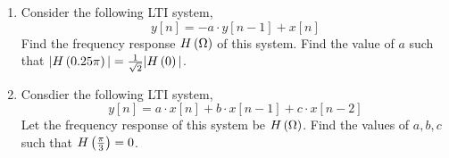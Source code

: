 \documentclass[9pt]{article}
\def\lp{\ensuremath\left(}
\def\rp{\ensuremath\right)}
\begin{document}
\begin{multicols}{2}
\begin{enumerate}
        \item Consider the following LTI system,
        \[ y[n] = -a \cdot y[n-1] + x[n] \]
        Find the frequency response $H\lp \Omega \rp$ of this system. Find the value of $a$ such that $\vert H\lp 0.25\pi \rp\vert = \frac{1}{\sqrt {2}} \lvert H \lp 0 \rp \vert$.

        \item Consdier the following LTI system,
        \[ y[n] = a\cdot x[n] + b \cdot x[n-1] + c \cdot x[n-2] \]
        Let the frequency response of this system be $H\lp \Omega \rp$. Find the values of $a, b, c$ such that $H\lp \frac{\pi}{3} \rp = 0$.
    \end{enumerate}
    \vfill
\end{multicols}
\end{document}
